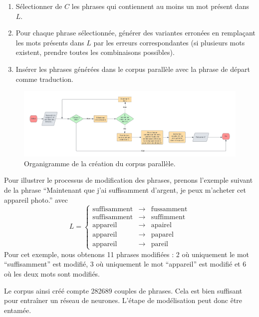 \begin{enumerate}[label=\arabic*. ]
    \item Sélectionner de \(C\) les phrases qui contiennent au moins un mot présent dans \(L\).
    \item Pour chaque phrase sélectionnée, générer des variantes erronées en remplaçant les mots présents dans \(L\)
    par les erreurs correspondantes (si plusieurs mots existent, prendre toutes les combinaisons possibles).
    \item Insérer les phrases générées dans le corpus parallèle avec la phrase de départ comme traduction.
\end{enumerate}
\begin{figure}[hbt]
    \begin{center}
        \includegraphics[width=\textwidth]{assets/pdf/flow.pdf}
    \end{center}
    \caption{Organigramme de la création du corpus parallèle.}
    \label{fig:flow-corpus}
\end{figure}
Pour illustrer le processus de modification des phrases, prenons l'exemple suivant de la phrase
``Maintenant que j'ai suffisamment d'argent, je peux m'acheter cet appareil photo.'' avec 
\[
    L = \left\{
        \begin{array}{lcl}
            \text{suffisamment} &\to& \text{fussamment}\\
            \text{suffisamment} &\to& \text{suffimment}\\
            \text{appareil} &\to& \text{apairel}\\
            \text{appareil} &\to& \text{paparel}\\ 
            \text{appareil} &\to& \text{pareil}
        \end{array}
        \right.
\]
Pour cet exemple, nous obtenons 11 phrases modifiées : 
2 où uniquement le mot ``suffisamment'' est modifié, 
3 où uniquement le mot ``appareil'' est modifié et 
6 où les deux mots sont modifiés.


Le corpus ainsi créé compte 282689 couples de phrases.
Cela est bien suffisant pour entraîner un réseau de neurones.
L'étape de modélisation peut donc être entamée.
